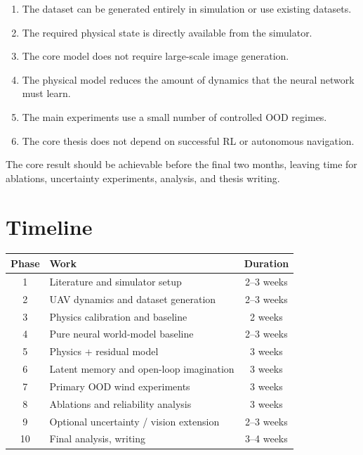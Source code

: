 \documentclass[conference]{IEEEtran}
\begin{document}
\begin{enumerate}
    \item The dataset can be generated entirely in simulation or use existing datasets.
    \item The required physical state is directly available from the
    simulator.
    \item The core model does not require large-scale image generation.
    \item The physical model reduces the amount of dynamics that the
    neural network must learn.
    \item The main experiments use a small number of controlled OOD
    regimes.
    \item The core thesis does not depend on successful RL or autonomous
    navigation.
\end{enumerate}

The core result should be achievable before the final two months,
leaving time for ablations, uncertainty experiments, analysis, and
thesis writing.


\section{Timeline}


\begin{center}
\renewcommand{\arraystretch}{1.2}
\begin{tabular}{c l c}
\toprule
\textbf{Phase} & \textbf{Work} & \textbf{Duration} \\
\midrule
1 & Literature and simulator setup & 2--3 weeks \\
2 & UAV dynamics and dataset generation & 2--3 weeks \\
3 & Physics calibration and baseline & 2 weeks \\
4 & Pure neural world-model baseline & 2--3 weeks \\
5 & Physics + residual model & 3 weeks \\
6 & Latent memory and open-loop imagination & 3 weeks \\
7 & Primary OOD wind experiments & 3 weeks \\
8 & Ablations and reliability analysis & 3 weeks \\
9 & Optional uncertainty / vision extension & 2--3 weeks \\
10 & Final analysis, writing & 3--4 weeks \\
\bottomrule
\end{tabular}
\end{center}
\end{document}
